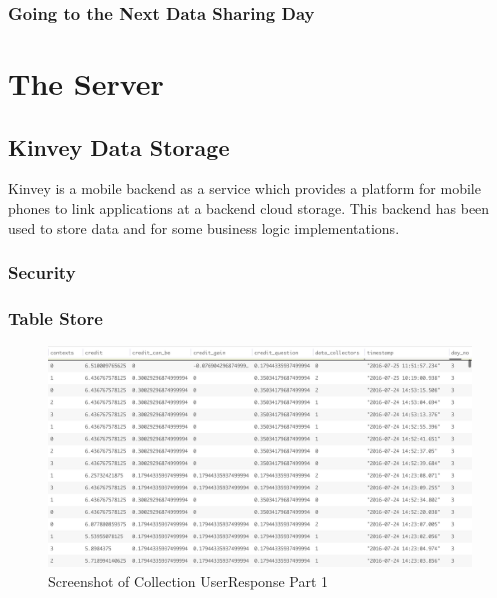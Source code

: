 \subsubsection{Going to the Next Data Sharing Day} \label{next}



\section{The Server}

\subsection{Kinvey Data Storage}

Kinvey is a mobile backend as a service which provides a platform for mobile phones to link applications at a backend cloud storage. This backend has been used to store data and for some business logic implementations.
\subsubsection{Security}

\subsubsection{Table Store}

\begin{figure}[ht!]
\centering
\includegraphics[width=\textwidth,keepaspectratio, height=0.6\textwidth]{./images/collection_ur_1}
\caption{Screenshot of Collection UserResponse Part 1}
\label{fig:col_ur_1}
\end{figure}

